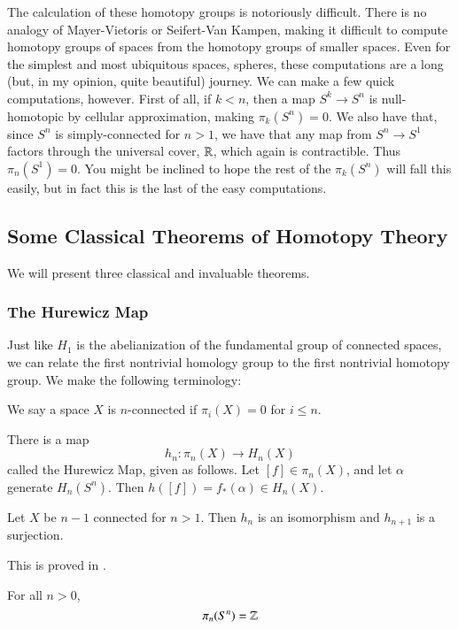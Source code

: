 The calculation of these homotopy groups is notoriously difficult.  
There is no analogy of Mayer-Vietoris or Seifert-Van Kampen, making it difficult to compute homotopy groups of spaces from the homotopy groups of smaller spaces.
Even for the simplest and most ubiquitous spaces, spheres, these computations are a long (but, in my opinion, quite beautiful) journey.  
We can make a few quick computations, however.  
First of all, if $k<n$, then a map $S^k\to S^n$ is null-homotopic by cellular approximation, making $\pi_k(S^n)=0$.  
We also have that, since $S^n$ is simply-connected for $n>1$, we have that any map from $S^n\to S^1$ factors through the universal cover, $\mathbb{R}$, which again is contractible.  
Thus $\pi_n(S^1)=0$.  
You might be inclined to hope the rest of the $\pi_k(S^n)$ will fall this easily, but in fact this is the last of the easy computations.  

\subsection{Some Classical Theorems of Homotopy Theory}

We will present three classical and invaluable theorems.  

\subsubsection{The Hurewicz Map}

Just like $H_1$ is the abelianization of the fundamental group of connected spaces, we can relate the first nontrivial homology group to the first nontrivial homotopy group.  
We make the following terminology:
\begin{Def}
We say a space $X$ is $n$-connected if $\pi_i(X)=0$ for $i\le n$.
\end{Def}


There is a map 
\[h_n:\pi_n(X)\to H_n(X)\]
called the Hurewicz Map, given as follows.  Let $[f]\in \pi_n(X)$, and let $\alpha$ generate $H_n(S^n)$.  
Then $h([f])=f_*(\alpha)\in H_n(X)$.  
\begin{Theorem}
  \label{sec:hurthm}
  Let $X$ be $n-1$ connected for $n>1$.  
  Then $h_n$ is an isomorphism and $h_{n+1}$ is a surjection.  
\end{Theorem}

This is proved in \cite[Thm~4.32]{HatcherAT}.

\begin{Cor}
  For all $n>0$, 
  \[\pi_n(S^n)=\mathbb{Z}\]
\end{Cor}

